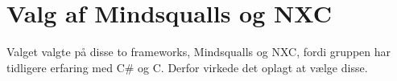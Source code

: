\section{Valg af Mindsqualls og NXC}
Valget valgte på disse to frameworks, Mindsqualls og NXC, fordi gruppen har tidligere erfaring med C# og C.
Derfor virkede det oplagt at vælge disse.